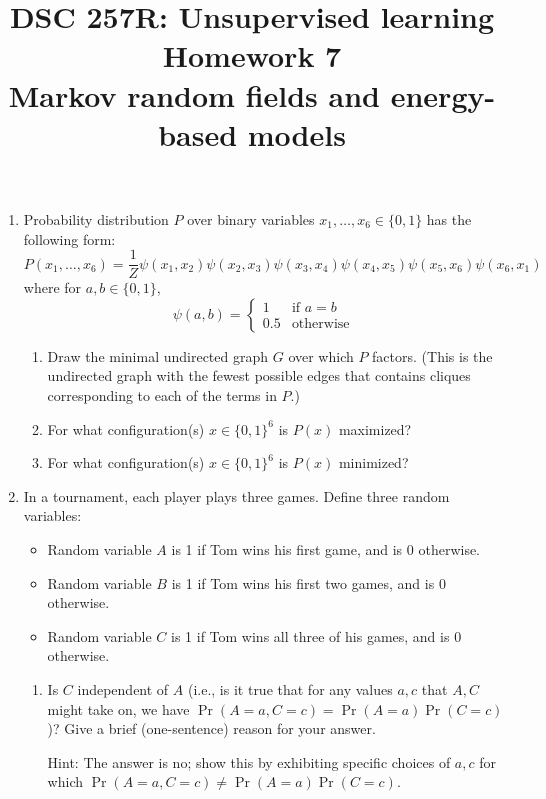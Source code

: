 \documentclass[11pt]{article}
\title{DSC 257R: Unsupervised learning\\Homework 7\\Markov random fields and energy-based models}
\author{}
\date{}
\begin{document}
\maketitle

\begin{enumerate}

\item Probability distribution $P$ over binary variables $x_1, \ldots, x_6 \in \{0, 1\}$ has the following form:
\[
P(x_1, \ldots, x_6) = \frac{1}{Z} \psi(x_1, x_2)\psi(x_2, x_3)\psi(x_3, x_4)\psi(x_4, x_5)\psi(x_5, x_6)\psi(x_6, x_1)
\]
where for $a, b \in \{0, 1\}$,
\[
\psi(a, b) = \begin{cases}
1 & \text{if } a = b\\
0.5 & \text{otherwise}
\end{cases}
\]

\begin{enumerate}
\item Draw the minimal undirected graph $G$ over which $P$ factors. (This is the undirected graph with the fewest possible edges that contains cliques corresponding to each of the terms in $P$.)

\item For what configuration(s) $x \in \{0, 1\}^6$ is $P(x)$ maximized?

\item For what configuration(s) $x \in \{0, 1\}^6$ is $P(x)$ minimized?
\end{enumerate}

\item In a tournament, each player plays three games. Define three random variables:
\begin{itemize}
\item Random variable $A$ is 1 if Tom wins his first game, and is 0 otherwise.
\item Random variable $B$ is 1 if Tom wins his first two games, and is 0 otherwise.
\item Random variable $C$ is 1 if Tom wins all three of his games, and is 0 otherwise.
\end{itemize}

\begin{enumerate}
\item Is $C$ independent of $A$ (i.e., is it true that for any values $a, c$ that $A, C$ might take on, we have $\Pr(A = a, C = c) = \Pr(A = a)\Pr(C = c)$)? Give a brief (one-sentence) reason for your answer.

Hint: The answer is no; show this by exhibiting specific choices of $a, c$ for which $\Pr(A = a, C = c) \neq \Pr(A = a)\Pr(C = c)$.


\end{enumerate}
\end{enumerate}
\end{document}
